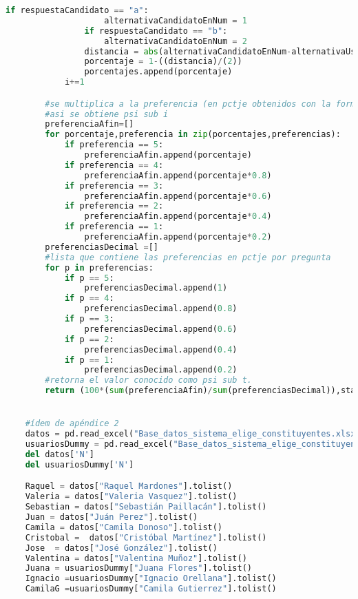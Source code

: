 \documentclass[a4paper]{article}
\begin{document}
\begin{lstlisting}[language=Python]
                if respuestaCandidato == "a":
                    alternativaCandidatoEnNum = 1
                if respuestaCandidato == "b":
                    alternativaCandidatoEnNum = 2
                distancia = abs(alternativaCandidatoEnNum-alternativaUsuarioEnNum)
                porcentaje = 1-((distancia)/(2))
                porcentajes.append(porcentaje)   
            i+=1

        #se multiplica a la preferencia (en pctje obtenidos con la formula mostrada) por el cap correspondiente
        #asi se obtiene psi sub i
        preferenciaAfin=[]
        for porcentaje,preferencia in zip(porcentajes,preferencias):
            if preferencia == 5:
                preferenciaAfin.append(porcentaje)
            if preferencia == 4:
                preferenciaAfin.append(porcentaje*0.8)
            if preferencia == 3:
                preferenciaAfin.append(porcentaje*0.6)
            if preferencia == 2:
                preferenciaAfin.append(porcentaje*0.4)
            if preferencia == 1:
                preferenciaAfin.append(porcentaje*0.2)
        preferenciasDecimal =[]
        #lista que contiene las preferencias en pctje por pregunta
        for p in preferencias:
            if p == 5:
                preferenciasDecimal.append(1)
            if p == 4:
                preferenciasDecimal.append(0.8)
            if p == 3:
                preferenciasDecimal.append(0.6)
            if p == 2:
                preferenciasDecimal.append(0.4)
            if p == 1:
                preferenciasDecimal.append(0.2)
        #retorna el valor conocido como psi sub t.
        return (100*(sum(preferenciaAfin)/sum(preferenciasDecimal)),statistics.pstdev(preferenciaAfin))


    #ídem de apéndice 2
    datos = pd.read_excel("Base_datos_sistema_elige_constituyentes.xlsx")
    usuariosDummy = pd.read_excel("Base_datos_sistema_elige_constituyentes.xlsx", sheet_name = "Respuestas usuariosas")
    del datos['N']
    del usuariosDummy['N']

    Raquel = datos["Raquel Mardones"].tolist()
    Valeria = datos["Valeria Vasquez"].tolist()
    Sebastian = datos["Sebastián Paillacán"].tolist()
    Juan = datos["Juán Perez"].tolist()
    Camila = datos["Camila Donoso"].tolist()
    Cristobal =  datos["Cristóbal Martínez"].tolist()
    Jose  = datos["José González"].tolist()
    Valentina = datos["Valentina Muñoz"].tolist()
    Juana = usuariosDummy["Juana Flores"].tolist()
    Ignacio =usuariosDummy["Ignacio Orellana"].tolist()
    CamilaG =usuariosDummy["Camila Gutierrez"].tolist()
    

\end{lstlisting}
\end{document}
